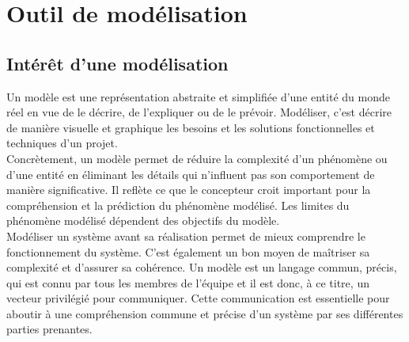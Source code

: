 \section{Outil de modélisation}
\subsection{Intérêt d'une modélisation}
Un modèle est une représentation abstraite et simplifiée d'une entité du monde réel en vue de le décrire, de l'expliquer ou de le prévoir. Modéliser, c’est décrire de manière visuelle et graphique les besoins et les solutions fonctionnelles et techniques d'un projet.\\
Concrètement, un modèle permet de réduire la complexité d'un phénomène ou d'une entité en éliminant les détails qui n'influent pas son comportement de manière significative. Il reflète ce que le concepteur croit important pour la compréhension et la prédiction du phénomène modélisé. Les limites du phénomène modélisé dépendent des objectifs du modèle.\\
Modéliser un système avant sa réalisation permet de mieux comprendre le fonctionnement du système. C’est également un bon moyen de maîtriser sa complexité et d’assurer sa cohérence. Un modèle est un langage commun, précis, qui est connu par tous les membres de l’équipe et il est donc, à ce titre, un vecteur privilégié pour communiquer. Cette communication est essentielle pour aboutir à une compréhension commune  et précise d'un système par ses différentes parties prenantes.
